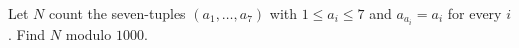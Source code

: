 Let $N$ count the seven-tuples $(a_1,\ldots,a_7)$ with $1\le a_i\le7$ and $a_{a_i}=a_i$ for every $i$. Find $N$ modulo $1000$.
